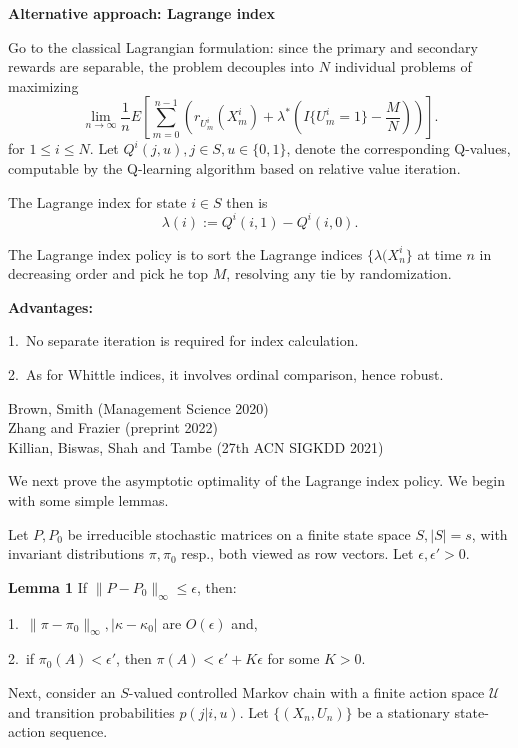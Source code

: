 \documentclass{slides}
\newcommand{\U}{\mathcal{U}}
\begin{document}
{\large \color{dred}

\textbf{Alternative approach: Lagrange index}

Go to the classical Lagrangian formulation: since the primary and secondary rewards are separable, the problem decouples into $N$ individual problems of maximizing
$$\lim_{n\to\infty}\frac{1}{n}E\left[\sum_{m=0}^{n-1}\left(r_{U^i_m}(X^i_m) + \lambda^*\left(I\{U^i_m = 1\} - \frac{M}{N}\right)\right)\right].$$
for $1\leq i \leq N$. Let $Q^i(j,u), j \in S, u \in \{0,1\}$, denote the corresponding Q-values, computable by the Q-learning algorithm based on relative value iteration.

The {\color{red} Lagrange index} for state $i \in S$ then is 
$$\lambda(i) := Q^i(i,1) - Q^i(i,0).$$

\newpage

The {\color{red} Lagrange index policy} is to sort the Lagrange indices $\{\lambda(X^i_n\}$ at time $n$ in decreasing order and pick he top $M$, resolving any tie by randomization.

\textbf{Advantages:}

1.\ No separate iteration is required for index calculation.

2.\ As for Whittle indices, it involves ordinal comparison, hence robust.

\newpage

Brown, Smith (Management Science 2020)\\
Zhang and Frazier (preprint 2022)\\
Killian, Biswas, Shah and Tambe (27th ACN SIGKDD 2021)\\

\newpage

We next prove the asymptotic optimality of the Lagrange index policy. We begin with some simple lemmas.

Let $P, P_0$ be irreducible stochastic matrices on a finite state space $S, |S| = s$, with invariant distributions $\pi,\pi_0$ resp., both viewed as row vectors.
Let $\epsilon, \epsilon' > 0$.

\textbf{Lemma 1} If $\|P-P_0\|_\infty \leq \epsilon$, then:

1.\  $\|\pi-\pi_0\|_\infty, |\kappa-\kappa_0|$ are $O(\epsilon)$ and,

2.\ if $\pi_0(A) < \epsilon'$, then $\pi(A) < \epsilon' + K\epsilon$ for some $K > 0$.

\newpage

Next, consider an $S$-valued controlled Markov chain with a finite action space $\U$ and transition probabilities $p(j|i,u)$. Let $\{(X_n,U_n)\}$ be a stationary state-action sequence.

}
\end{document}
